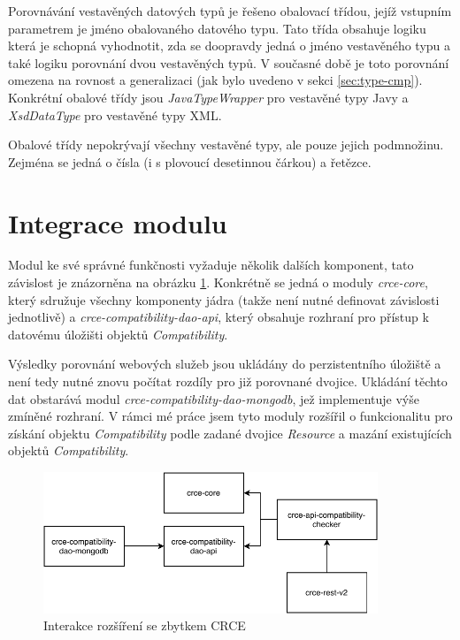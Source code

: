 \documentclass[czech,DP]{thesiskiv}
\begin{document}
Porovnávání vestavěných datových typů je řešeno obalovací třídou, jejíž vstupním parametrem je jméno obalovaného datového typu. Tato třída obsahuje logiku která je schopná vyhodnotit, zda se doopravdy jedná o jméno vestavěného typu a také logiku porovnání dvou vestavěných typů. V současné době je toto porovnání omezena na rovnost a generalizaci (jak bylo uvedeno v sekci \ref{sec:type-cmp}). Konkrétní obalové třídy jsou \textit{JavaTypeWrapper} pro vestavěné typy Javy a \textit{XsdDataType} pro vestavěné typy XML. 

Obalové třídy nepokrývají všechny vestavěné typy, ale pouze jejich podmnožinu. Zejména se jedná o čísla (i s plovoucí desetinnou čárkou) a řetězce.

\section{Integrace modulu}

Modul ke své správné funkčnosti vyžaduje několik dalších komponent, tato závislost je znázorněna na obrázku \ref{fig:apicomp-crce-interaction}. Konkrétně se jedná o moduly \textit{crce-core}, který sdružuje všechny komponenty jádra (takže není nutné definovat závislosti jednotlivě) a \textit{crce-compatibility-dao-api}, který obsahuje rozhraní pro přístup k datovému úložišti objektů \textit{Compatibility}. 

Výsledky porovnání webových služeb jsou ukládány do perzistentního úložiště a není tedy nutné znovu počítat rozdíly pro již porovnané dvojice. Ukládání těchto dat obstarává modul \textit{crce-compatibility-dao-mongodb}, jež implementuje výše  zmíněné rozhraní. V rámci mé práce jsem tyto moduly rozšířil o funkcionalitu pro získání objektu \textit{Compatibility} podle zadané dvojice \textit{Resource} a mazání existujících objektů \textit{Compatibility}.

\begin{figure}[h]
	\centering
	\includegraphics[width=10cm]{module-integration}
	\caption{Interakce rozšíření se zbytkem CRCE}
	\label{fig:apicomp-crce-interaction}
\end{figure}
\end{document}
